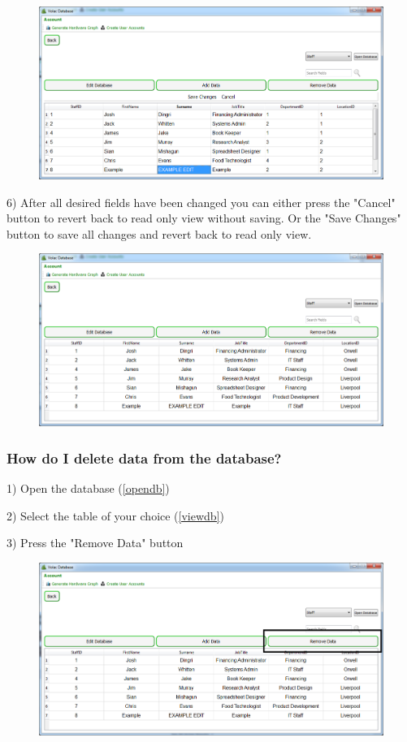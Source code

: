 \begin{figure}[H]
    \includegraphics[width=\textwidth]{./Manual/Images/editdata2.png}
\end{figure}

6) After all desired fields have been changed you can either press the "Cancel" button to revert back to read only view without saving. Or the "Save Changes" button to save all changes and revert back to read only view.

\begin{figure}[H]
    \includegraphics[width=\textwidth]{./Manual/Images/editdata3.png}
\end{figure}

\subsubsection{How do I delete data from the database?}

1) Open the database (\ref{opendb})

2) Select the table of your choice (\ref{viewdb})

3) Press the "Remove Data" button

\begin{figure}[H]
    \includegraphics[width=\textwidth]{./Manual/Images/deletedata.png}
\end{figure}

